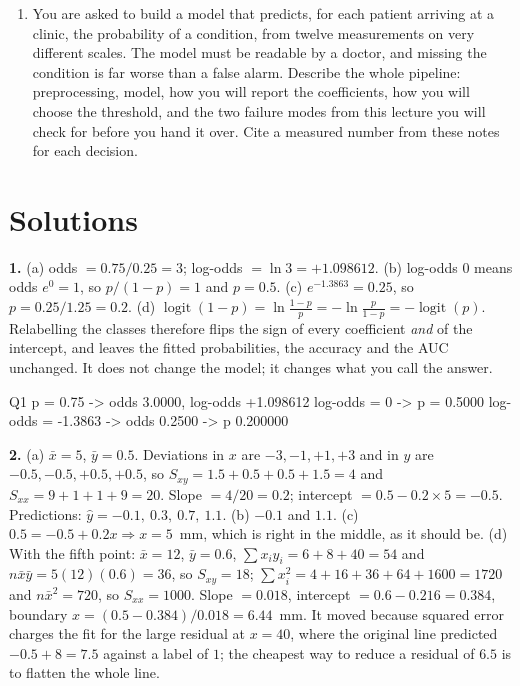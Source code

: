 \documentclass[11pt]{article}
\begin{document}
\begin{enumerate}[leftmargin=*]
  \item\label{q:design} You are asked to build a model that predicts, for each
    patient arriving at a clinic, the probability of a condition, from twelve
    measurements on very different scales. The model must be readable by a
    doctor, and missing the condition is far worse than a false alarm.
    Describe the whole pipeline: preprocessing, model, how you will report the
    coefficients, how you will choose the threshold, and the two failure modes
    from this lecture you will check for before you hand it over. Cite a
    measured number from these notes for each decision.
\end{enumerate}

\section{Solutions}
\label{sec:solutions}

\textbf{1.} (a) odds $= 0.75/0.25 = 3$; log-odds $= \ln 3 = +1.098612$.
(b) log-odds $0$ means odds $e^{0} = 1$, so $p/(1-p) = 1$ and $p = 0.5$.
(c) $e^{-1.3863} = 0.25$, so $p = 0.25/1.25 = 0.2$.
(d) $\operatorname{logit}(1-p) = \ln\frac{1-p}{p}
 = -\ln\frac{p}{1-p} = -\operatorname{logit}(p)$. Relabelling the classes
therefore flips the sign of every coefficient \emph{and} of the intercept,
and leaves the fitted probabilities, the accuracy and the AUC unchanged. It
does not change the model; it changes what you call the answer.

\begin{codeout}
Q1  p = 0.75 -> odds 3.0000, log-odds +1.098612
    log-odds = 0 -> p = 0.5000
    log-odds = -1.3863 -> odds 0.2500 -> p 0.200000
\end{codeout}

\medskip
\textbf{2.} (a) $\bar x = 5$, $\bar y = 0.5$. Deviations in $x$ are
$-3, -1, +1, +3$ and in $y$ are $-0.5, -0.5, +0.5, +0.5$, so
$S_{xy} = 1.5 + 0.5 + 0.5 + 1.5 = 4$ and $S_{xx} = 9+1+1+9 = 20$. Slope
$= 4/20 = 0.2$; intercept $= 0.5 - 0.2\times 5 = -0.5$. Predictions:
$\hat y = -0.1,\ 0.3,\ 0.7,\ 1.1$.
(b) $-0.1$ and $1.1$.
(c) $0.5 = -0.5 + 0.2x \Rightarrow x = 5$~mm, which is right in the middle,
as it should be.
(d) With the fifth point: $\bar x = 12$, $\bar y = 0.6$,
$\sum x_iy_i = 6+8+40 = 54$ and $n\bar x\bar y = 5(12)(0.6) = 36$, so
$S_{xy} = 18$; $\sum x_i^2 = 4+16+36+64+1600 = 1720$ and
$n\bar x^2 = 720$, so $S_{xx} = 1000$. Slope $= 0.018$, intercept
$= 0.6 - 0.216 = 0.384$, boundary $x = (0.5-0.384)/0.018 = 6.44$~mm. It moved
because squared error charges the fit for the large residual at $x = 40$,
where the original line predicted $-0.5 + 8 = 7.5$ against a label of $1$; the
cheapest way to reduce a residual of $6.5$ is to flatten the whole line.
\end{document}
